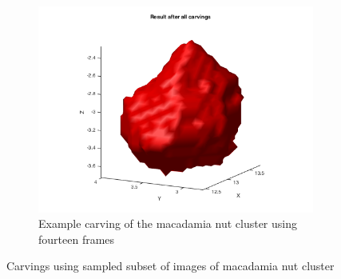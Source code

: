 \documentclass[10pt,twocolumn,letterpaper]{article}
\begin{document}
\begin{figure}
\begin{subfigure}[t]{0.3\textwidth}
    \end{subfigure}
    ~
    \begin{subfigure}[t]{0.3\textwidth}
        \centering
        \includegraphics[width=\textwidth]{macadamia_14.png}
        \caption{Example carving of the macadamia nut cluster using fourteen frames}
    \end{subfigure}
    \caption{Carvings using sampled subset of images of macadamia nut cluster}
    \label{nut-carving}
\end{figure}
\end{document}
